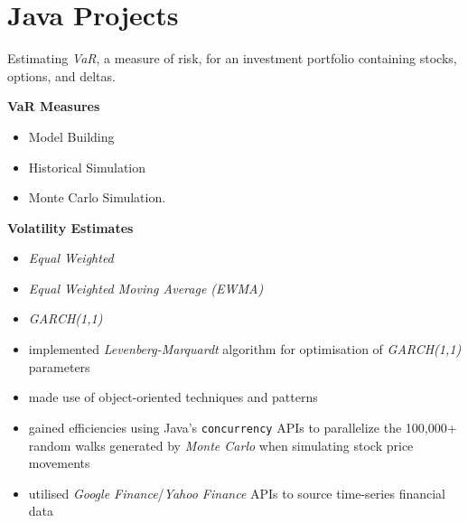 \documentclass[letterpaper,11pt]{article}
\begin{document}
\section{Java Projects}
\begin{description}[style=multiline,leftmargin=4cm]

	\item[Value at Risk \textnormal{Dissertation} \textnormal{\tiny
		      \href{https://adrian.ng/java/var/}{adrian.ng/java/var/}}]
	      Estimating \textit{VaR}, a measure of risk, for an investment portfolio containing stocks, options, and deltas.

	      \begin{minipage}[b]{0.2\textwidth}
		      \vspace{0.5cm}
		      \textbf{VaR Measures}
		      \begin{itemize}[leftmargin=*]
			      \tiny
			      \item Model Building
			      \item Historical Simulation
			      \item Monte Carlo Simulation.
		      \end{itemize}
		      \textbf{Volatility Estimates}
		      \begin{itemize}[leftmargin=*]
			      \tiny
			      \item \textit{Equal Weighted}
			      \item \textit{Equal Weighted Moving Average (EWMA)}
			      \item \textit{GARCH(1,1)}
		      \end{itemize}
	      \end{minipage}
	      \hspace{0.25cm}
	      \begin{minipage}[b]{0.55\textwidth}

		      \begin{itemize}[leftmargin=*]
			      \item implemented \textit{Levenberg-Marquardt} algorithm for optimisation of \textit{GARCH(1,1)} parameters
			      \item made use of object-oriented techniques and patterns
			      \item gained efficiencies using Java's \texttt{concurrency} APIs to parallelize the 100,000+ random walks generated by \textit{Monte Carlo} when simulating stock price movements
			      \item utilised \textit{Google Finance}/\textit{Yahoo Finance} APIs to source time-series financial data
		      \end{itemize}
	      \end{minipage}


\end{description}
\end{document}
